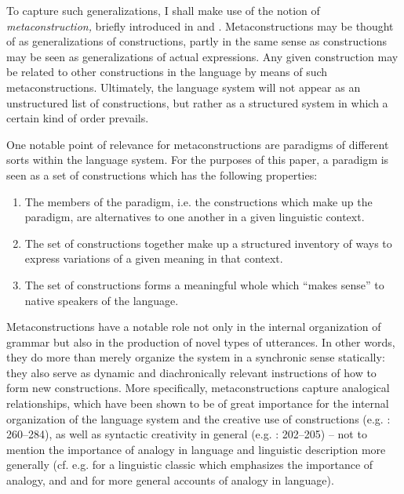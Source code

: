 \documentclass[output=paper, colorlinks,citecolor=brown]{langsci/langscibook}
\begin{document}
To capture such generalizations, I shall make use of the notion of \textit{metaconstruction,} briefly introduced in \citet{Leino2003} and \citet{LeinoÖstman2005}. Metaconstructions may be thought of as generalizations of constructions, partly in the same sense as constructions may be seen as generalizations of actual expressions. Any given construction may be related to other constructions in the language by means of such metaconstructions. Ultimately, the language system will not appear as an unstructured list of constructions, but rather as a structured system in which a certain kind of order prevails.

One notable point of relevance for metaconstructions are paradigms of different sorts within the language system. For the purposes of this paper, a paradigm is seen as a set of constructions which has the following properties:

\begin{enumerate}
\item The members of the paradigm, i.e. the constructions which make up the paradigm, are alternatives to one another in a given linguistic context.
\item The set of constructions together make up a structured inventory of ways to express variations of a given meaning in that context.
\item The set of constructions forms a meaningful whole which “makes sense” to native speakers of the language.
\end{enumerate}

Metaconstructions have a notable role not only in the internal organization of grammar but also in the production of novel types of utterances. In other words, they do more than merely organize the system in a synchronic sense statically: they also serve as dynamic and diachronically relevant instructions of how to form new constructions. More specifically, metaconstructions capture analogical relationships, which have been shown to be of great importance for the internal organization of the language system and the creative use of constructions (e.g. \citealt{Leino2003}: 260–284), as well as syntactic creativity in general (e.g. \citealt{Tabor1994}: 202–205) -- not to mention the importance of analogy in language and linguistic description more generally (cf. e.g. \citealt{Bloomfield1933} for a linguistic classic which emphasizes the importance of analogy, and \citealt{Anttila1977} and \citealt{Itkonen2005} for more general accounts of analogy in language).
\end{document}

